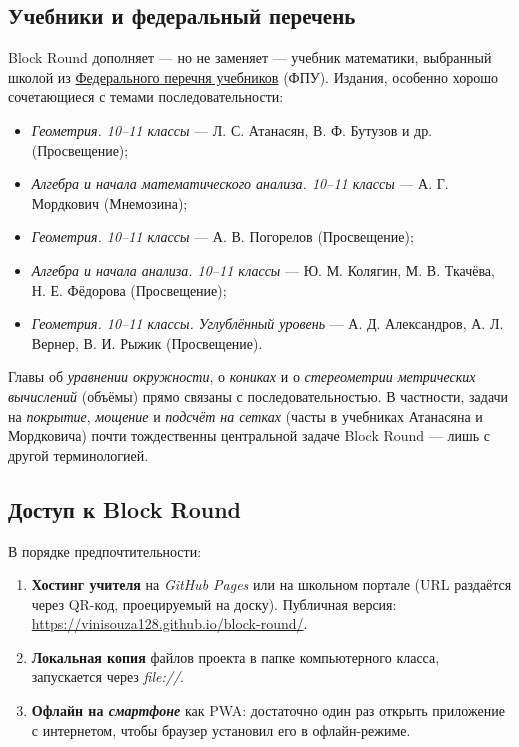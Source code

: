 \documentclass[12pt,a4paper]{scrartcl}
\begin{document}
\subsection{Учебники и федеральный перечень}\label{sec:fpu}

Block Round дополняет --- но не заменяет --- учебник математики, выбранный школой из \href{https://fpu.edu.ru/}{Федерального перечня учебников} (ФПУ). Издания, особенно хорошо сочетающиеся с темами последовательности:

\begin{itemize}[leftmargin=1.3em,itemsep=0.1em,topsep=0.2em,nosep]
  \item \emph{Геометрия. 10--11 классы} --- Л. С. Атанасян, В. Ф. Бутузов и др. (Просвещение);
  \item \emph{Алгебра и начала математического анализа. 10--11 классы} --- А. Г. Мордкович (Мнемозина);
  \item \emph{Геометрия. 10--11 классы} --- А. В. Погорелов (Просвещение);
  \item \emph{Алгебра и начала анализа. 10--11 классы} --- Ю. М. Колягин, М. В. Ткачёва, Н. Е. Фёдорова (Просвещение);
  \item \emph{Геометрия. 10--11 классы. Углублённый уровень} --- А. Д. Александров, А. Л. Вернер, В. И. Рыжик (Просвещение).
\end{itemize}

Главы об \emph{уравнении окружности}, о \emph{кониках} и о \emph{стереометрии метрических вычислений} (объёмы) прямо связаны с последовательностью. В частности, задачи на \emph{покрытие}, \emph{мощение} и \emph{подсчёт на сетках} (часты в учебниках Атанасяна и Мордковича) почти тождественны центральной задаче Block Round --- лишь с другой терминологией.

\subsection{Доступ к Block Round}

В порядке предпочтительности:

\begin{enumerate}[leftmargin=1.5em,itemsep=0.15em,topsep=0.3em]
  \item \textbf{Хостинг учителя} на \emph{GitHub Pages} или на школьном портале (URL раздаётся через QR-код, проецируемый на доску). Публичная версия: \url{https://vinisouza128.github.io/block-round/}.
  \item \textbf{Локальная копия} файлов проекта в папке компьютерного класса, запускается через \emph{file://}.
  \item \textbf{Офлайн на \emph{смартфоне}} как PWA: достаточно один раз открыть приложение с интернетом, чтобы браузер установил его в офлайн-режиме.
\end{enumerate}
\end{document}
